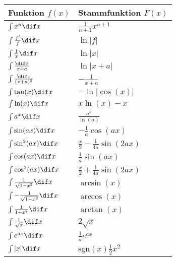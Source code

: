 \begin{center}
	\renewcommand{\arraystretch}{1.8}
		\begin{tabular}{|l|l|}
		\hline
		\textbf{Funktion} $f(x)$ & \textbf{Stammfunktion} $F(x)$ \\
		\hline
		$\int x^n \dif x$ & $\frac{1}{n+1}x^{n+1}$ \\
		$\int \frac{f'}{f}\dif x$ & $\ln \left\lvert f \right\rvert$ \\
		$\int \frac{1}{x} \dif x$ & $\ln \left\lvert x \right\rvert$ \\
		$\int \frac{\dif x}{x+a}$ & $\ln \left\lvert x+a \right\rvert$ \\
		$\int \frac{\dif x}{(x+a)^2}$ & $-\frac{1}{x+a}$ \\
		$\int \tan(x) \dif x$ & $-\ln \left\lvert \cos(x) \right\rvert$ \\
		$\int \ln(x) \dif x$ & $x \ln(x) - x$ \\
		$\int a^x \dif x$ & $\frac{a^x}{\ln(a)}$ \\
		$\int \sin(ax)\dif x$ & $- \frac{1}{a} \cos(a x)$ \\
		$\int \sin^2(ax)\dif x$ & $\frac{x}{2} - \frac{1}{4a} \sin(2 a x)$ \\
		$\int \cos(ax)\dif x$ & $\frac{1}{a} \sin(a x)$ \\
		$\int \cos^2(ax)\dif x$ & $\frac{x}{2} + \frac{1}{4a} \sin(2 a x)$ \\
		$\int \frac{1}{\sqrt{1-x^2}}\dif x$ & $\arcsin(x)$ \\
		$\int -\frac{1}{\sqrt{1-x^2}}\dif x$ & $\arccos(x)$ \\
		$\int \frac{1}{1+x^2}\dif x$ & $\arctan(x)$ \\
		$\int \frac{1}{\sqrt{x}}\dif x$ & $2 \sqrt{x}$ \\
		$\int e^{ax} \dif x$ & $\frac{1}{a} e^{ax}$ \\
		$\int |x| \dif x$ & $\text{sgn}(x) \frac{1}{2} x^2$\\
		\hline
	\end{tabular}
\end{center}
